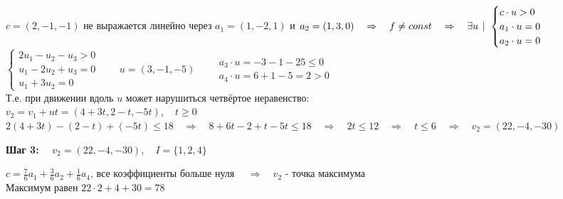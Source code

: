 \documentclass{article}
\newcommand{\tch}{\hspace{4px}|\hspace{4px}}
\newcommand{\rimpl}{\quad \Rightarrow \quad}
\begin{document}
	\begin{center}
		$c = (2, -1, -1)$ не выражается линейно через $a_1 = (1, -2, 1)$ и $a_2 = (1, 3, 0) \rimpl f \not= const \rimpl \exists u \tch \begin{cases}
		c\cdot u > 0 \\ a_1\cdot u = 0 \\ a_2\cdot u = 0
		\end{cases}$ \\
		$\begin{cases}
		2u_1 - u_2 - u_3 > 0 \\ u_1 -2u_2 + u_3 = 0 \\ u_1 + 3u_2 = 0
		\end{cases} \qquad u = (3, -1, -5) \qquad \begin{array}{l}
		a_3\cdot u = -3 - 1 - 25 \leq 0 \\
		a_4\cdot u = 6 + 1 - 5 = 2 > 0
		\end{array}$ \\
		Т.е. при движении вдоль $u$ может нарушиться четвёртое неравенство:\\
		$v_2 = v_1 + ut = (4 + 3t,2 -t, -5t), \quad t \geq 0$\\
		$2(4+3t) - (2-t) + (-5t) \leq 18 \rimpl
		8+6t - 2+t -5t \leq 18
	    \rimpl
		2t \leq 12
		\rimpl
		t \leq 6
		\rimpl v_2 = (22, -4, -30)$
	\end{center}
	\textbf{Шаг 3:} $\quad v_2 = (22, -4, -30),\quad I = \lbrace1, 2, 4\rbrace$
	\begin{center}
		$c = \frac{7}{6}a_1 + \frac{3}{6}a_2 + \frac{1}{6}a_4$, все коэффициенты больше нуля
		$\rimpl v_2$ - точка максимума \\
		Максимум равен $22\cdot2 + 4 + 30 = 78$
	\end{center}
	
	
	

	
	

	
\end{document}
